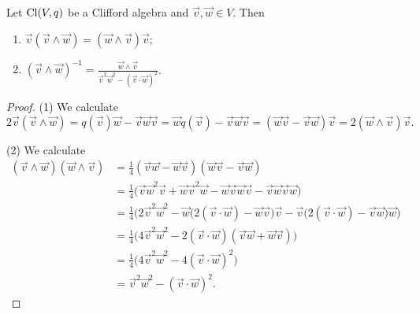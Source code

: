 \begin{lemma} \label{CliffordIdentities}
Let $\operatorname{Cl}(V,q)$ be a Clifford algebra and $\vec{v},\vec{w}\in V$.
Then
\begin{enumerate}
\item $\vec{v}(\vec{v}\wedge \vec{w}) = (\vec{w}\wedge \vec{v})\vec{v}$;
\item $(\vec{v}\wedge \vec{w})^{-1} = \frac{\vec{w}\wedge \vec{v}}{\vec{v}^2 \vec{w}^2 - (\vec{v}\cdot \vec{w})^2}$.
\end{enumerate}
\end{lemma}
\begin{proof}
(1) We calculate
\[ 2\vec{v}(\vec{v}\wedge \vec{w}) = q(\vec{v})\vec{w} - \vec{v}\vec{w}\vec{v} = \vec{w}q(\vec{v}) - \vec{v}\vec{w}\vec{v} = (\vec{w}\vec{v} - \vec{v}\vec{w})\vec{v} = 2(\vec{w}\wedge \vec{v})\vec{v}. \]

(2) We calculate
\begin{align*}
(\vec{v}\wedge \vec{w})(\vec{w}\wedge \vec{v}) &= \frac{1}{4}(\vec{v}\vec{w}- \vec{w}\vec{v})(\vec{w}\vec{v} - \vec{v}\vec{w}) \\
&= \frac{1}{4}\big(\vec{v}\vec{w}^2 \vec{v} + \vec{w}\vec{v}^2 \vec{w} - \vec{w}\vec{v}\vec{w}\vec{v} - \vec{v}\vec{w}\vec{v}\vec{w}\big) \\
&= \frac{1}{4}\Big(2\vec{v}^2\vec{w}^2 - \vec{w}\big(2(\vec{v}\cdot\vec{w}) - \vec{w}\vec{v}\big)\vec{v} - \vec{v}\big(2(\vec{v}\cdot\vec{w}) - \vec{v}\vec{w}\big)\vec{w}\Big) \\
&= \frac{1}{4}\Big(4\vec{v}^2\vec{w}^2 - 2(\vec{v}\cdot\vec{w})(\vec{v}\vec{w}+\vec{w}\vec{v})\Big) \\
&= \frac{1}{4}\Big(4\vec{v}^2\vec{w}^2 - 4(\vec{v}\cdot\vec{w})^2\Big) \\
&= \vec{v}^2\vec{w}^2 - (\vec{v}\cdot\vec{w})^2.
\end{align*}
\end{proof}

